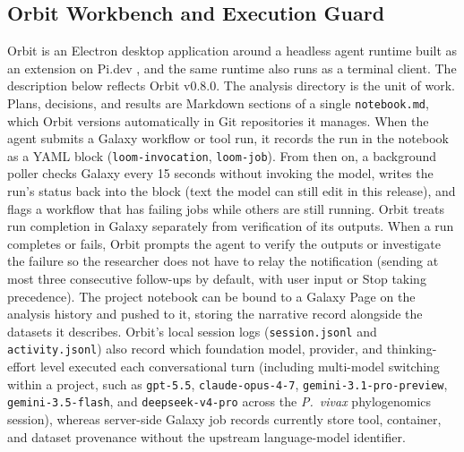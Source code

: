 \documentclass[11pt,letterpaper]{article}
\newcommand{\tool}[1]{\textsf{#1}}
\begin{document}
\subsection*{\tool{Orbit} Workbench and Execution Guard}
\tool{Orbit} is an Electron desktop application around a headless agent runtime built as an extension on \tool{Pi.dev} \cite{pidev2026}, and the same runtime also runs as a terminal client. The description below reflects \tool{Orbit} v0.8.0. The analysis directory is the unit of work. Plans, decisions, and results are Markdown sections of a single \texttt{notebook.md}, which \tool{Orbit} versions automatically in Git repositories it manages. When the agent submits a Galaxy workflow or tool run, it records the run in the notebook as a YAML block (\texttt{loom-invocation}, \texttt{loom-job}). From then on, a background poller checks Galaxy every 15 seconds without invoking the model, writes the run's status back into the block (text the model can still edit in this release), and flags a workflow that has failing jobs while others are still running. \tool{Orbit} treats run completion in Galaxy separately from verification of its outputs. When a run completes or fails, \tool{Orbit} prompts the agent to verify the outputs or investigate the failure so the researcher does not have to relay the notification (sending at most three consecutive follow-ups by default, with user input or Stop taking precedence). The project notebook can be bound to a Galaxy Page on the analysis history and pushed to it, storing the narrative record alongside the datasets it describes. \tool{Orbit}'s local session logs (\texttt{session.jsonl} and \texttt{activity.jsonl}) also record which foundation model, provider, and thinking-effort level executed each conversational turn (including multi-model switching within a project, such as \texttt{gpt-5.5}, \texttt{claude-opus-4-7}, \texttt{gemini-3.1-pro-preview}, \texttt{gemini-3.5-flash}, and \texttt{deepseek-v4-pro} across the \textit{P.\ vivax} phylogenomics session), whereas server-side Galaxy job records currently store tool, container, and dataset provenance without the upstream language-model identifier.
\end{document}
